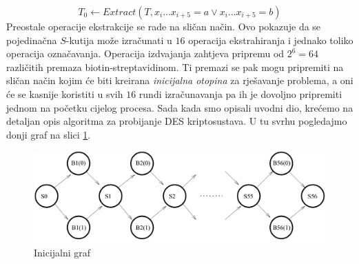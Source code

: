 \documentclass[a4paper,oneside,12pt]{memoir} %
\begin{document}
\begin{spacing}{1.5}
\[T_0 \leftarrow Extract(T, x_i...x_{i+5}=a \vee x_i...x_{i+5}=b)\]
Preostale operacije ekstrakcije se rade na sličan način. Ovo pokazuje da se pojedinačna $S$-kutija može izračunati u $16$ operacija ekstrahiranja i jednako toliko operacija označavanja.	Operacija izdvajanja zahtjeva pripremu od $2^6=64$ različitih premaza biotin-streptavidinom. Ti premazi se pak mogu pripremiti na sličan način kojim će biti kreirana \textit{inicijalna otopina}  za rješavanje problema, a oni će se kasnije koristiti u svih $16$ rundi izračunavanja pa ih je dovoljno pripremiti jednom na početku cijelog procesa. Sada kada smo opisali uvodni dio, krećemo na detaljan opis algoritma za probijanje DES kriptosustava. U tu svrhu pogledajmo donji graf na slici \ref{fig:graf}.
\begin{figure}[h]
\centering \includegraphics[scale=0.5]{graf.png}
\caption{Inicijalni graf}
\label{fig:graf}
\end{figure}


\end{spacing}
\end{document}
